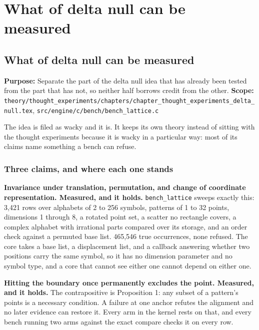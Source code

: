 \chapter{What of delta null can be measured}

\section{What of delta null can be measured}

\textbf{Purpose:} Separate the part of the delta null idea that has already been tested from the part that has not, so neither half borrows credit from the other. \textbf{Scope:} \texttt{theory/\allowbreak{}thought\_\allowbreak{}experiments/\allowbreak{}chapters/\allowbreak{}chapter\_\allowbreak{}thought\_\allowbreak{}experiments\_\allowbreak{}delta\_\allowbreak{}null.\allowbreak{}tex}, \texttt{src/\allowbreak{}engine/\allowbreak{}c/\allowbreak{}bench/\allowbreak{}bench\_\allowbreak{}lattice.\allowbreak{}c}

The idea is filed as wacky and it is. It keeps its own theory instead of sitting with the thought experiments because it is wacky in a particular way: most of its claims name something a bench can refuse.

\subsection{Three claims, and where each one stands}

\textbf{Invariance under translation, permutation, and change of coordinate representation. Measured, and it holds.} \texttt{bench\_\allowbreak{}lattice} sweeps exactly this: 3,421 rows over alphabets of 2 to 256 symbols, patterns of 1 to 32 points, dimensions 1 through 8, a rotated point set, a scatter no rectangle covers, a complex alphabet with irrational parts compared over its storage, and an order check against a permuted base list. 465,546 true occurrences, none refused. The core takes a base list, a displacement list, and a callback answering whether two positions carry the same symbol, so it has no dimension parameter and no symbol type, and a core that cannot see either one cannot depend on either one.

\textbf{Hitting the boundary once permanently excludes the point. Measured, and it holds.} The contrapositive is Proposition 1: any subset of a pattern's points is a necessary condition. A failure at one anchor refutes the alignment and no later evidence can restore it. Every arm in the kernel rests on that, and every bench running two arms against the exact compare checks it on every row.

